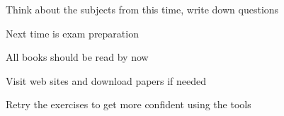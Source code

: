 \documentclass[Screen16to9,17pt]{foils}
\begin{document}


\begin{list1}
\item Think about the subjects from this time, write down questions

\item Next time is exam preparation
\item All books should be read by now
\item Visit web sites and download papers if needed
\item Retry the exercises to get more confident using the tools
\end{list1}
\end{document}
